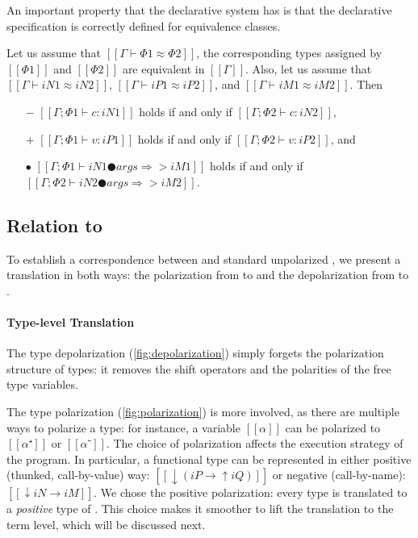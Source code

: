   An important property that the declarative system has is
  that the declarative specification is correctly defined for
  equivalence classes.

\begin{property}
  Let us assume that $[[Γ ⊢ Φ1 ≈ Φ2]]$, \ie  
  the corresponding types assigned by $[[Φ1]]$ and
  $[[Φ2]]$ are equivalent in $[[Γ]]$.
  Also, let us assume that 
  $[[Γ ⊢ iN1 ≈ iN2]]$, $[[Γ ⊢ iP1 ≈ iP2]]$,
  and $[[Γ ⊢ iM1 ≈ iM2]]$. Then
  \begin{itemize}
    \item [$-$] $[[Γ ; Φ1 ⊢ c : iN1]]$ holds if and only if $[[Γ ; Φ2 ⊢ c : iN2]]$,
    \item [$+$] $[[Γ ; Φ1 ⊢ v : iP1]]$ holds if and only if $[[Γ ; Φ2 ⊢ v : iP2]]$, and
    \item [$\bullet$] $[[Γ; Φ1 ⊢ iN1 ● args ⇒> iM1]]$ holds if and only if $[[Γ; Φ2 ⊢ iN2 ● args ⇒> iM2]]$.
  \end{itemize}
\end{property}

\subsection{Relation to \systemf}
\label{sec:rel-to-systemf}

To establish a correspondence between \fexists and standard unpolarized \systemf,
we present a translation in both ways: the polarization from \systemf to \fexists
and the depolarization from \fexists to \systemf.



\paragraph*{Type-level Translation}

The type depolarization (\cref{fig:depolarization}) simply forgets the polarization structure of types:
it removes the shift operators and the polarities of the free type variables.

The type polarization (\cref{fig:polarization}) is more involved, as there are
multiple ways to polarize a type: for instance, a variable $[[α]]$ can be
polarized to $[[α⁺]]$ or $[[α⁻]]$. The choice of polarization affects the
execution strategy of the program. 
In particular, a functional type can be represented in either positive (thunked, call-by-value) way:
$[[↓(iP → ↑iQ)]]$ or negative (call-by-name): $[[↓iN → iM]]$.
We chose the positive polarization: every \systemf type is translated to a
\emph{positive} type of \fexists. This choice makes it smoother to lift the
translation to the term level, which will be discussed next.

